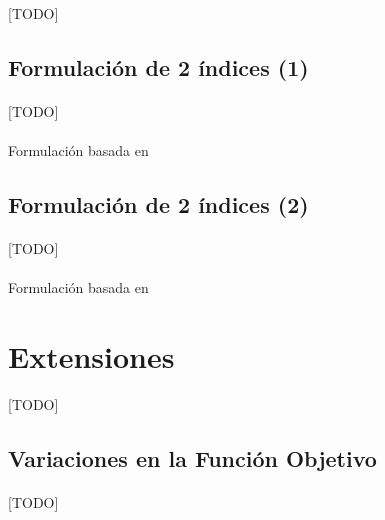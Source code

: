 \documentclass{subfiles}
\begin{document}
      \paragraph{}
      [TODO]

      \subsection{Formulación de 2 índices (1)}
      \label{sec:formulation_two_index_1_formulation}

        \paragraph{}
        [TODO]

        \paragraph{}
        Formulación basada en \cite{ropke2007models}

        \subsection{Formulación de 2 índices (2)}
      \label{sec:formulation_two_index_2_formulation}

        \paragraph{}
        [TODO]

        \paragraph{}
        Formulación basada en \cite{ropke2007models}

    \section{Extensiones}
    \label{sec:formulation_extensions}
      [TODO]

      \subsection{Variaciones en la Función Objetivo}
      \label{sec:formulation_extensions_objective_functions}

        \paragraph{}
        [TODO]
\end{document}
